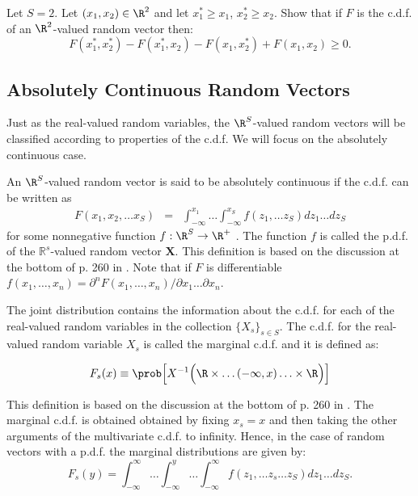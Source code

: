 \documentclass[11pt]{article} %
\begin{document}
\begin{prproblem}
Let $S=2$. Let $(x_1,x_2) \in \R^{2}$ and let $x_1^* \geq x_1$, $x_2^* \geq x_2$. Show that if $F$ is the c.d.f. of an $\R^2$-valued random vector then: 
$$F(x_1^*, x_2^*)-F(x_1^*, x_2)-F(x_1, x_2^*)+F(x_1, x_2) \geq 0.$$
\end{prproblem}

\newpage

\subsection{Absolutely Continuous Random Vectors}

Just as the real-valued random variables, the $\R^S$-valued random vectors will be classified according to properties of the c.d.f. We will focus on the absolutely continuous case.

\begin{definition}  An $\R^{S}$-valued random vector is said to be absolutely continuous if the c.d.f. can be written as
\begin{eqnarray*}
F(x_1, x_2, \ldots x_S) &=& \int_{-\infty}^{x_1} \ldots  \int_{-\infty}^{x_S} f(z_1, \ldots z_S) dz_1 \ldots  dz_S
\end{eqnarray*}
\noindent for some nonnegative function $f:\R^{S} \rightarrow \R^{+}$ . The function $f$ is called the p.d.f. of the $\mathbb{R}^s$-valued random vector $\bm{X}$. This definition is based on the discussion at the bottom of p. 260 in \cite{Billingsley95}. Note that if $F$ is differentiable $f(x_1, \ldots, x_n) = \partial^n F(x_1, \ldots, x_n)/ \partial x_1 \ldots \partial x_n$.
\end{definition}

The joint distribution contains the information about the c.d.f. for each of the real-valued random variables in the collection $\{X_s\}_{s \in S}$. The c.d.f. for the real-valued random variable $X_s$ is called the marginal c.d.f. and it is defined as:

\begin{definition} [Marginal c.d.f.]
$$F_s(x) \equiv \prob \Big[ X^{-1} \Big( \R \times \ldots (-\infty, x ) \ldots \times \R \Big) \Big]  $$
\end{definition}
\noindent This definition is based on the discussion at the bottom of p. 260 in \cite{Billingsley95}. The marginal c.d.f. is obtained obtained by fixing $x_s=x$ and then taking the other arguments of the multivariate c.d.f. to infinity. Hence, in the case of random vectors with a p.d.f. the marginal distributions are given by:
$$F_s(y) = \int_{-\infty}^{\infty} \ldots  \int_{-\infty}^{y} \ldots \int_{-\infty}^{\infty} f(z_1, \ldots z_s \ldots z_S) dz_1 \ldots  dz_S. $$
\end{document}
